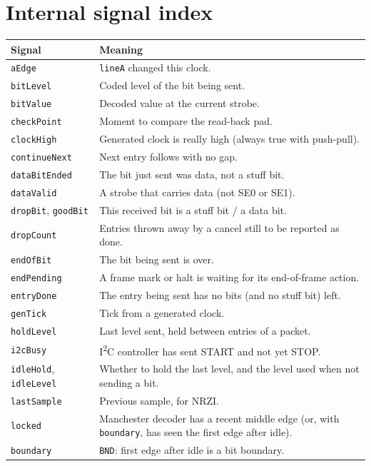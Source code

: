 \documentclass[11pt,a4paper]{article}
\newcommand{\sig}[1]{\texttt{#1}}
\begin{document}
\appendix
\section{Internal signal index}

\begin{longtable}{@{}l p{11cm}@{}}
\toprule
Signal & Meaning \\
\midrule
\endhead
\sig{aEdge} & \sig{lineA} changed this clock. \\
\sig{bitLevel} & Coded level of the bit being sent. \\
\sig{bitValue} & Decoded value at the current strobe. \\
\sig{checkPoint} & Moment to compare the read-back pad. \\
\sig{clockHigh} & Generated clock is really high (always true with push-pull). \\
\sig{continueNext} & Next entry follows with no gap. \\
\sig{dataBitEnded} & The bit just sent was data, not a stuff bit. \\
\sig{dataValid} & A strobe that carries data (not SE0 or SE1). \\
\sig{dropBit}, \sig{goodBit} & This received bit is a stuff bit / a data bit. \\
\sig{dropCount} & Entries thrown away by a cancel still to be reported as done. \\
\sig{endOfBit} & The bit being sent is over. \\
\sig{endPending} & A frame mark or halt is waiting for its end-of-frame action. \\
\sig{entryDone} & The entry being sent has no bits (and no stuff bit) left. \\
\sig{genTick} & Tick from a generated clock. \\
\sig{holdLevel} & Last level sent, held between entries of a packet. \\
\sig{i2cBusy} & I\textsuperscript{2}C controller has sent START and not yet STOP. \\
\sig{idleHold}, \sig{idleLevel} & Whether to hold the last level, and the level used when not sending a bit. \\
\sig{lastSample} & Previous sample, for NRZI. \\
\sig{locked} & Manchester decoder has a recent middle edge (or, with \sig{boundary}, has seen the first edge after idle). \\
\sig{boundary} & \sig{BND}: first edge after idle is a bit boundary. \\

\end{longtable}
\end{document}
